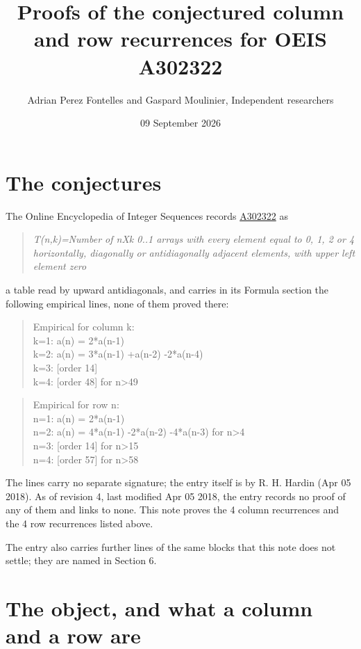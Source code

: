 \documentclass[11pt]{article}
\title{Proofs of the conjectured column and row recurrences for OEIS A302322}
\author{Adrian Perez Fontelles and Gaspard Moulinier, Independent researchers}
\date{09 September 2026}
\theoremstyle{definition}
\begin{document}
\maketitle
\section{The conjectures}

The Online Encyclopedia of Integer Sequences records \href{https://oeis.org/A302322}{A302322} as

\begin{quote}\itshape T(n,k)=Number of nXk 0..1 arrays with every element equal to 0, 1, 2 or 4 horizontally, diagonally or antidiagonally adjacent elements, with upper left element zero\end{quote}

a table read by upward antidiagonals, and carries in its Formula section the following empirical lines, none of them proved there:

\begin{quote}\ttfamily Empirical for column k:\\
k=1: a(n) = 2*a(n-1)\\k=2: a(n) = 3*a(n-1) +a(n-2) -2*a(n-4)\\k=3: [order 14]\\k=4: [order 48] for n>49\end{quote}

\begin{quote}\ttfamily Empirical for row n:\\
n=1: a(n) = 2*a(n-1)\\n=2: a(n) = 4*a(n-1) -2*a(n-2) -4*a(n-3) for n>4\\n=3: [order 14] for n>15\\n=4: [order 57] for n>58\end{quote}

The lines carry no separate signature; the entry itself is by R. H. Hardin (Apr 05 2018). As of revision 4, last modified Apr 05 2018, the entry records no proof of any of them and links to none. This note proves the 4 column recurrences and the 4 row recurrences listed above.

The entry also carries further lines of the same blocks that this note does not settle; they are named in Section 6.

\section{The object, and what a column and a row are}
\end{document}
